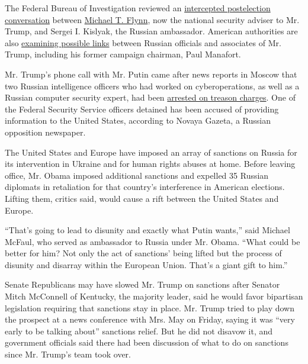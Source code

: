 The Federal Bureau of Investigation reviewed an
\href{https://www.nytimes.com/2017/01/13/us/politics/donald-trump-transition.html}{intercepted
postelection conversation} between
\href{https://www.nytimes.com/2016/12/03/us/politics/in-national-security-adviser-michael-flynn-experience-meets-a-prickly-past.html}{Michael
T. Flynn}, now the national security adviser to Mr. Trump, and Sergei I.
Kislyak, the Russian ambassador. American authorities are also
\href{https://www.nytimes.com/2017/01/19/us/politics/trump-russia-associates-investigation.html}{examining
possible links} between Russian officials and associates of Mr. Trump,
including his former campaign chairman, Paul Manafort.

Mr. Trump's phone call with Mr. Putin came after news reports in Moscow
that two Russian intelligence officers who had worked on
cyberoperations, as well as a Russian computer security expert, had been
\href{https://www.nytimes.com/2017/01/27/world/europe/russia-hacking-us-election.html?ref=todayspaper}{arrested
on treason charges}. One of the Federal Security Service officers
detained has been accused of providing information to the United States,
according to Novaya Gazeta, a Russian opposition newspaper.

The United States and Europe have imposed an array of sanctions on
Russia for its intervention in Ukraine and for human rights abuses at
home. Before leaving office, Mr. Obama imposed additional sanctions and
expelled 35 Russian diplomats in retaliation for that country's
interference in American elections. Lifting them, critics said, would
cause a rift between the United States and Europe.

``That's going to lead to disunity and exactly what Putin wants,'' said
Michael McFaul, who served as ambassador to Russia under Mr. Obama.
``What could be better for him? Not only the act of sanctions' being
lifted but the process of disunity and disarray within the European
Union. That's a giant gift to him.''

Senate Republicans may have slowed Mr. Trump on sanctions after Senator
Mitch McConnell of Kentucky, the majority leader, said he would favor
bipartisan legislation requiring that sanctions stay in place. Mr. Trump
tried to play down the prospect at a news conference with Mrs. May on
Friday, saying it was ``very early to be talking about'' sanctions
relief. But he did not disavow it, and government officials said there
had been discussion of what to do on sanctions since Mr. Trump's team
took over.


